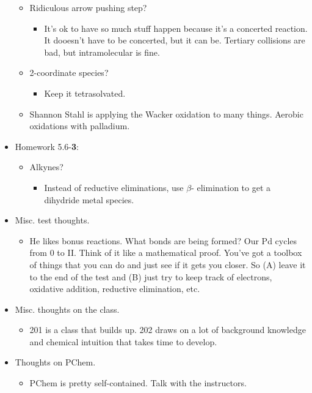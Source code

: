 \documentclass[../notes.tex]{subfiles}
\begin{document}
\begin{itemize}
\begin{itemize}
\begin{itemize}
        \end{itemize}
        \item Ridiculous arrow pushing step?
        \begin{itemize}
            \item It's ok to have so much stuff happen because it's a concerted reaction. It dooesn't have to be concerted, but it can be. Tertiary collisions are bad, but intramolecular is fine.
        \end{itemize}
        \item 2-coordinate species?
        \begin{itemize}
            \item Keep it tetrasolvated.
        \end{itemize}
        \item Shannon Stahl is applying the Wacker oxidation to many things. Aerobic oxidations with palladium.
    \end{itemize}
    \item Homework 5.6-\textbf{3}:
    \begin{itemize}
        \item Alkynes?
        \begin{itemize}
            \item Instead of reductive eliminations, use $\beta$- elimination to get a dihydride metal species.
        \end{itemize}
    \end{itemize}
    \item Misc. test thoughts.
    \begin{itemize}
        \item He likes bonus reactions. What bonds are being formed? Our Pd cycles from 0 to II. Think of it like a mathematical proof. You've got a toolbox of things that you can do and just see if it gets you closer. So (A) leave it to the end of the test and (B) just try to keep track of electrons, oxidative addition, reductive elimination, etc.
    \end{itemize}
    \item Misc. thoughts on the class.
    \begin{itemize}
        \item 201 is a class that builds up. 202 draws on a lot of background knowledge and chemical intuition that takes time to develop.
    \end{itemize}
    \item Thoughts on PChem.
    \begin{itemize}
        \item PChem is pretty self-contained. Talk with the instructors.
    \end{itemize}
\end{itemize}
\end{document}

